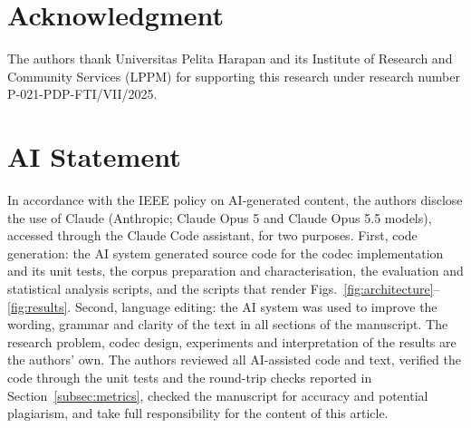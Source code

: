 \documentclass[conference]{IEEEtran}
\begin{document}
\section*{Acknowledgment}

The authors thank Universitas Pelita Harapan and its Institute of Research and Community Services (LPPM) for supporting this research under research number P-021-PDP-FTI/VII/2025.

\section*{AI Statement}

In accordance with the IEEE policy on AI-generated content, the authors disclose the use of Claude (Anthropic; Claude Opus 5 and Claude Opus 5.5 models), accessed through the Claude Code assistant, for two purposes. First, code generation: the AI system generated source code for the codec implementation and its unit tests, the corpus preparation and characterisation, the evaluation and statistical analysis scripts, and the scripts that render Figs.~\ref{fig:architecture}--\ref{fig:results}. Second, language editing: the AI system was used to improve the wording, grammar and clarity of the text in all sections of the manuscript. The research problem, codec design, experiments and interpretation of the results are the authors' own. The authors reviewed all AI-assisted code and text, verified the code through the unit tests and the round-trip checks reported in Section~\ref{subsec:metrics}, checked the manuscript for accuracy and potential plagiarism, and take full responsibility for the content of this article.
\end{document}
